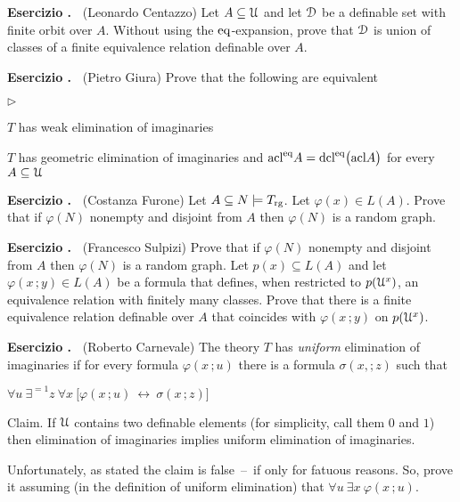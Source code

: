 \documentclass[10pt]{article}
\def\phi{\varphi}
\def\D{\EuScript D}
\def\U{\EuScript U}
\def\E{\exists}
\def\A{\forall}
\def\iff{\leftrightarrow}
\def\acl{\textrm{acl}}
\def\dcl{\textrm{dcl}}
\def\eq{{\rm eq}}
\newcommand{\labella}[1]{{\sf\footnotesize #1}\hfill}
\renewenvironment{itemize}
  {\begin{list}{$\triangleright$}{%
   \setlength{\parskip}{0mm}
   \setlength{\topsep}{0mm}
   \setlength{\rightmargin}{0mm}
   \setlength{\listparindent}{0mm}
   \setlength{\itemindent}{0mm}
   \setlength{\labelwidth}{3ex}
   \setlength{\itemsep}{0mm}
   \setlength{\parsep}{0mm}
   \setlength{\partopsep}{0mm}
   \setlength{\labelsep}{1ex}
   \setlength{\leftmargin}{\labelwidth+\labelsep}
   \let\makelabel\labella}}{%
   \vspace*{-.3\baselineskip}
  \end{list}}
\newcounter{ex}
\newenvironment{exercise}{\bigskip\addtocounter{ex}{1}\textbf{Esercizio \theex.\ }}{}
\begin{document}
\begin{exercise}
  (Leonardo Centazzo)
  Let $A\subseteq\U$ and let $\D$ be a definable set with finite orbit over $A$.
  Without using the $\eq$-expansion, prove that $\D$ is union of classes of a finite equivalence relation definable over $A$.
\end{exercise}

\begin{exercise}
  (Pietro Giura)
    Prove that the following are equivalent
    \begin{itemize}
    \item[1.]  $T$ has weak elimination of imaginaries
    \item[2.]  $T$ has geometric elimination of imaginaries and $\acl^\eq A=\dcl^\eq\big(\acl A\big)$ for every $A\subseteq\U$
    \end{itemize} 
\end{exercise}

\begin{exercise} 
  (Costanza Furone)
  Let $A\subseteq N\models T_{\rm rg}$.
  Let $\phi(x)\in L(A)$.
  Prove that if $\phi(N)$ nonempty and disjoint from $A$ then $\phi(N)$ is a random graph.
\end{exercise}

\begin{exercise} 
  (Francesco Sulpizi)
  Prove that if $\phi(N)$ nonempty and disjoint from $A$ then $\phi(N)$ is a random graph.
  Let $p(x)\subseteq L(A)$ and let $\phi(x\,;y)\in L(A)$ be a formula that defines, when restricted to $p(\U^x)$, an equivalence relation with finitely many classes.
  Prove that there is a finite equivalence relation definable over $A$ that coincides with $\phi(x\,;y)$ on $p(\U^x)$.
\end{exercise}

\begin{exercise}
  (Roberto Carnevale)
  The theory $T$ has \textit{uniform\/} elimination of imaginaries if for every formula $\phi(x\,;u)$ there is a formula $\sigma(x,;z)$ such that  

  \hfil  $\A u\ \E^{=1} z\ \A x\ \big[\phi(x\,;u)\ \iff\ \sigma(x\,;z)\big]$

  Claim. If $\U$ contains two definable elements (for simplicity, call them $0$ and $1$) then elimination of imaginaries implies uniform elimination of imaginaries.
  
  Unfortunately, as stated the claim is false~--~if only for fatuous reasons. So, prove it assuming (in the definition of uniform elimination) that $\A u\ \E x\ \phi(x\,;u)$.
\end{exercise}
\end{document}
